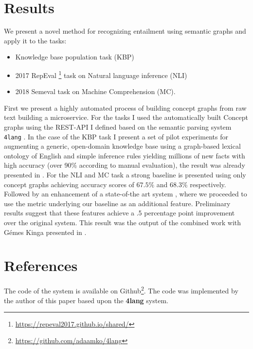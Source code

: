 \section{Results}
We present a novel method for recognizing entailment using semantic
graphs and apply it to the tasks:
\begin{itemize}
    \item Knowledge base population task (KBP)
    \item 2017 RepEval \footnote{\url{https://repeval2017.github.io/shared/}} task on Natural language inference (NLI)
    \item 2018 Semeval task on Machine
    Comprehension (MC).
\end{itemize}
First we present a highly automated process of building concept graphs from raw text building a microservice.
For the tasks I used the automatically built Concept graphs using the REST-API I defined based on the semantic parsing system \texttt{4lang} \cite{Recski:2016d}.
In the case of the KBP task I present a set of pilot experiments for augmenting a generic, open-domain 
knowledge base using a graph-based lexical ontology of English and simple
inference rules yielding millions of new facts with high
accuracy (over 90\% according to manual evaluation), the result was already presented in \cite{Kovacs:2018}.
For the NLI and MC task a strong baseline is presented using only concept graphs achieving accuracy scores of $67.5\%$ and $68.3\%$ respectively.
Followed by an enhancement of a state-of-the art system
\cite{Wang:2018}, where we proceeded to use the metric underlying our baseline as an additional feature. Preliminary results suggest that these features achieve a .5 percentage point improvement over the original system. This result was the output of the combined work with G\'emes Kinga presented in \cite{Kovacs:2018b}.

\section{References}
The code of the system is available on Github\footnote{\url{https://github.com/adaamko/4lang}}. The code was implemented by the author of this paper based upon the \textbf{4lang} system.


